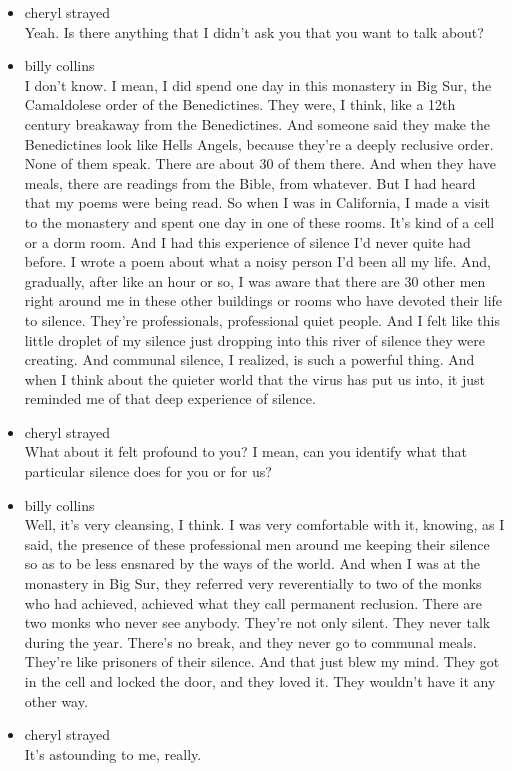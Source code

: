 \begin{itemize}
\item
  cheryl strayed\\
  Yeah. Is there anything that I didn't ask you that you want to talk
  about?
\item
  billy collins\\
  I don't know. I mean, I did spend one day in this monastery in Big
  Sur, the Camaldolese order of the Benedictines. They were, I think,
  like a 12th century breakaway from the Benedictines. And someone said
  they make the Benedictines look like Hells Angels, because they're a
  deeply reclusive order. None of them speak. There are about 30 of them
  there. And when they have meals, there are readings from the Bible,
  from whatever. But I had heard that my poems were being read. So when
  I was in California, I made a visit to the monastery and spent one day
  in one of these rooms. It's kind of a cell or a dorm room. And I had
  this experience of silence I'd never quite had before. I wrote a poem
  about what a noisy person I'd been all my life. And, gradually, after
  like an hour or so, I was aware that there are 30 other men right
  around me in these other buildings or rooms who have devoted their
  life to silence. They're professionals, professional quiet people. And
  I felt like this little droplet of my silence just dropping into this
  river of silence they were creating. And communal silence, I realized,
  is such a powerful thing. And when I think about the quieter world
  that the virus has put us into, it just reminded me of that deep
  experience of silence.
\item
  cheryl strayed\\
  What about it felt profound to you? I mean, can you identify what that
  particular silence does for you or for us?
\item
  billy collins\\
  Well, it's very cleansing, I think. I was very comfortable with it,
  knowing, as I said, the presence of these professional men around me
  keeping their silence so as to be less ensnared by the ways of the
  world. And when I was at the monastery in Big Sur, they referred very
  reverentially to two of the monks who had achieved, achieved what they
  call permanent reclusion. There are two monks who never see anybody.
  They're not only silent. They never talk during the year. There's no
  break, and they never go to communal meals. They're like prisoners of
  their silence. And that just blew my mind. They got in the cell and
  locked the door, and they loved it. They wouldn't have it any other
  way.
\item
  cheryl strayed\\
  It's astounding to me, really.


\end{itemize}
